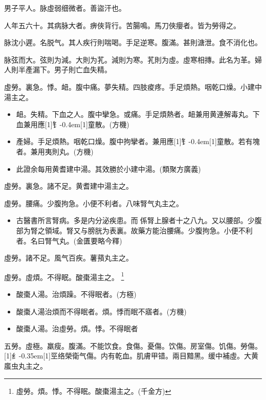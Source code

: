 \documentclass[oneside,b4paper]{ctexbook}
\begin{document}
\begin{flushleft}
男子平人。脉虛弱细微者。善盜汗也。

人年五六十。其病脉大者。痹俠背行。苦腸鳴。馬刀俠癭者。皆为勞得之。

脉沈小遲。名脱气。其人疾行則喘喝。手足逆寒。腹滿。甚則溏泄。食不消化也。

脉弦而大。弦則为減。大則为芤。減則为寒。芤則为虛。虛寒相摶。此名为革。婦人則半產漏下。男子則亡血失精。

虛勞。裏急。悸。衄。腹中痛。夢失精。四肢痠疼。手足煩熱。咽乾口燥。小建中湯主之。

\begin{itemize}
\item 衄。失精。下血之人。腹中攣急。或痛。手足煩熱者。衄兼用黄連解毒丸。下血兼用應{\hbox{\scalebox{0.7}[1]{钅}\kern-0.4em\scalebox{0.7}[1]{童}}}散。(方機)
\item 產婦。手足煩熱。咽乾口燥。腹中拘攣者。兼用應{\hbox{\scalebox{0.7}[1]{钅}\kern-0.4em\scalebox{0.7}[1]{童}}}散。若有塊者。兼用夷則丸。(方機)
\item 此證余每用黄耆建中湯。其效勝於小建中湯。(類聚方廣義)
\end{itemize}

虛勞。裏急。諸不足。黄耆建中湯主之。

虛勞。腰痛。少腹拘急。小便不利者。八味腎气丸主之。

\begin{itemize}
\item 古醫書所言腎病。多是内分泌疾患。而{𬮦}係腎上腺者十之八九。又以腰部。少腹部为腎之領域。腎又与膀胱为表裏。故藥方能治腰痛。少腹拘急。小便不利者。名曰腎气丸。(金匱要略今釋)
\end{itemize}

虛勞。諸不足。風气百疾。薯蕷丸主之。

虛勞。虛煩。不得眠。酸棗湯主之。
\footnote{虛勞。煩。悸。不得眠。酸棗湯主之。(千金方)}

\begin{itemize}
\item 酸棗人湯。治煩躁。不得眠者。(方極)
\item 酸棗人湯治煩而不得眠者。煩。悸而眠不寤者。(方機)
\item 酸棗人湯。治虛勞。煩。悸。不得眠者
\end{itemize}

五勞。虛極。羸瘦。腹滿。不能饮食。食傷。憂傷。饮傷。房室傷。饥傷。勞傷。{\hbox{\scalebox{0.68}[1]{纟}\kern-0.35em\scalebox{0.64}[1]{巠}}}络榮衛气傷。内有乾血。肌膚甲错。兩目黯黑。缓中補虛。大黄䗪虫丸主之。


\end{flushleft}
\end{document}
